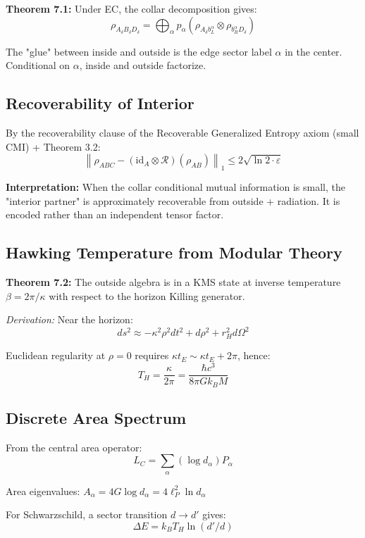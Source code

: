 \textbf{Theorem 7.1:} Under EC, the collar decomposition gives: \[\rho_{A_\delta B_\delta D_\delta} = \bigoplus_\alpha p_\alpha \left(\rho_{A_\delta b_L^\alpha} \otimes \rho_{b_R^\alpha D_\delta}\right)\]

The "glue" between inside and outside is the edge sector label \(\alpha\) in the center. Conditional on \(\alpha\), inside and outside factorize.

\subsection{Recoverability of Interior}\label{73-recoverability-of-interior}

By the recoverability clause of the Recoverable Generalized Entropy axiom (small CMI) + Theorem 3.2: \[\left\|\rho_{ABC} - (\text{id}_A \otimes \mathcal{R})(\rho_{AB})\right\|_1 \leq 2\sqrt{\ln 2 \cdot \varepsilon}\]

\textbf{Interpretation:} When the collar conditional mutual information is small, the "interior partner" is approximately recoverable from outside + radiation. It is encoded rather than an independent tensor factor.

\subsection{Hawking Temperature from Modular Theory}\label{74-hawking-temperature-from-modular-theory}

\textbf{Theorem 7.2:} The outside algebra is in a KMS state at inverse temperature \(\beta = 2\pi/\kappa\) with respect to the horizon Killing generator.

\emph{Derivation:} Near the horizon: \[ds^2 \approx -\kappa^2 \rho^2 dt^2 + d\rho^2 + r_H^2 d\Omega^2\]

Euclidean regularity at \(\rho = 0\) requires \(\kappa t_E \sim \kappa t_E + 2\pi\), hence: \[T_H = \frac{\kappa}{2\pi} = \frac{\hbar c^3}{8\pi G k_B M}\]

\subsection{Discrete Area Spectrum}\label{75-discrete-area-spectrum}

From the central area operator: \[L_C = \sum_\alpha (\log d_\alpha) P_\alpha\]

Area eigenvalues: \(A_\alpha = 4G \log d_\alpha = 4\ell_P^2 \ln d_\alpha\)

For Schwarzschild, a sector transition \(d \to d'\) gives: \[\Delta E = k_B T_H \ln(d'/d)\]

